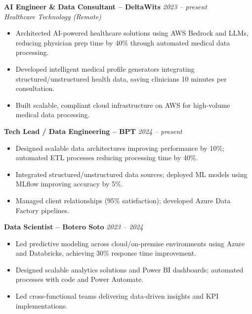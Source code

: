 \textbf{AI Engineer \& Data Consultant – DeltaWits} \hfill \textit{2023 – present} \\
\textit{Healthcare Technology (Remote)} \\[-0.6em]
\begin{itemize}[leftmargin=*]
    \item Architected AI-powered healthcare solutions using AWS Bedrock and LLMs, reducing physician prep time by 40\% through automated medical data processing.
    \item Developed intelligent medical profile generators integrating structured/unstructured health data, saving clinicians 10 minutes per consultation.
    \item Built scalable, compliant cloud infrastructure on AWS for high-volume medical data processing.
\end{itemize}

\vspace{0.1em}

\textbf{Tech Lead / Data Engineering – BPT} \hfill \textit{2024 – present} \\[-0.6em]
\begin{itemize}[leftmargin=*]
    \item Designed scalable data architectures improving performance by 10\%; automated ETL processes reducing processing time by 40\%.
    \item Integrated structured/unstructured data sources; deployed ML models using MLflow improving accuracy by 5\%.
    \item Managed client relationships (95\% satisfaction); developed Azure Data Factory pipelines.
\end{itemize}

\vspace{0.1em}

\textbf{Data Scientist – Botero Soto} \hfill \textit{2023 – 2024} \\[-0.6em]
\begin{itemize}[leftmargin=*]
    \item Led predictive modeling across cloud/on-premise environments using Azure and Databricks, achieving 30\% response time improvement.
    \item Designed scalable analytics solutions and Power BI dashboards; automated processes with code and Power Automate.
    \item Led cross-functional teams delivering data-driven insights and KPI implementations.
\end{itemize}

